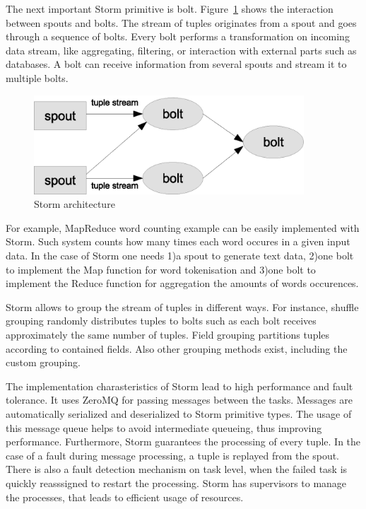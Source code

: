 The next important Storm primitive is bolt.
Figure~\ref{fig:storm_architecture} shows the interaction between spouts and bolts.
The stream of tuples originates from a spout and goes through a sequence of bolts.
Every bolt performs a transformation on incoming data stream, like aggregating, filtering, or interaction with external parts such as databases.
A bolt can receive information from several spouts and stream it to multiple bolts.

\begin{figure}
  \centering
  \includegraphics [width=0.9\textwidth]{images/storm_architecture}
  \caption{Storm architecture}
  \label{fig:storm_architecture}
\end{figure}

For example, MapReduce word counting example can be easily implemented with Storm.
Such system counts how many times each word occures in a given input data.
In the case of Storm one needs 
1)a spout to generate text data, 
2)one bolt to implement the Map function for word tokenisation and 
3)one bolt to implement the Reduce function for aggregation the amounts of words occurences. 

Storm allows to group the stream of tuples in different ways.
For instance, shuffle grouping randomly distributes tuples to bolts such as each bolt receives approximately the same number of tuples.
Field grouping partitions tuples according to contained fields.
Also other grouping methods exist, including the custom grouping.

The implementation charasteristics of Storm lead to high performance and fault tolerance.
It uses ZeroMQ for passing messages between the tasks.
Messages are automatically serialized and deserialized to Storm primitive types.
The usage of this message queue helps to avoid intermediate queueing, thus improving performance.
Furthermore, Storm guarantees the processing of every tuple.
In the case of a fault during message processing, a tuple is replayed from the spout.
There is also a fault detection mechanism on task level, when the failed task is quickly reasssigned to restart the processing.
Storm has supervisors to manage the processes, that leads to efficient usage of resources.

